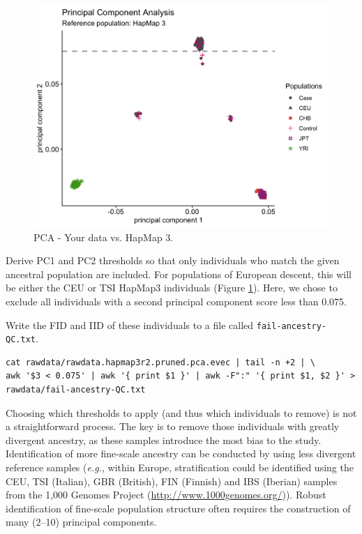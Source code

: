 \documentclass[
]{book}
\newcommand{\passthrough}[1]{#1}
\begin{document}
\begin{figure}

{\centering \includegraphics[width=18.67in]{img/pca-hapmap3} 

}

\caption{PCA - Your data vs. HapMap 3.}\label{fig:show-pca-hapmap3}
\end{figure}

Derive PC1 and PC2 thresholds so that only individuals who match the given ancestral population are included. For populations of European descent, this will be either the CEU or TSI HapMap3 individuals (Figure \ref{fig:show-pca-hapmap3}). Here, we chose to exclude all individuals with a second principal component score less than 0.075.

Write the FID and IID of these individuals to a file called \passthrough{\lstinline!fail-ancestry-QC.txt!}.

\begin{lstlisting}
cat rawdata/rawdata.hapmap3r2.pruned.pca.evec | tail -n +2 | \
awk '$3 < 0.075' | awk '{ print $1 }' | awk -F":" '{ print $1, $2 }' > rawdata/fail-ancestry-QC.txt
\end{lstlisting}

Choosing which thresholds to apply (and thus which individuals to remove) is not a straightforward process. The key is to remove those individuals with greatly divergent ancestry, as these samples introduce the most bias to the study. Identification of more fine-scale ancestry can be conducted by using less divergent reference samples (\emph{e.g.}, within Europe, stratification could be identified using the CEU, TSI (Italian), GBR (British), FIN (Finnish) and IBS (Iberian) samples from the 1,000 Genomes Project (\url{http://www.1000genomes.org/})). Robust identification of fine-scale population structure often requires the construction of many (2--10) principal components.
\end{document}
